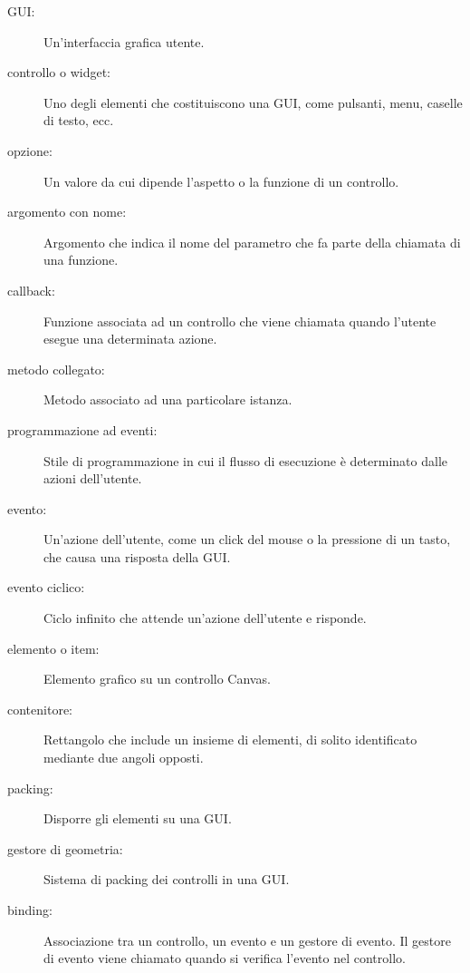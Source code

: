 \documentclass[10pt]{book}
\begin{document}
\begin{description}

\item[GUI:] Un'interfaccia grafica utente.

\item[controllo o widget:] Uno degli elementi che costituiscono una GUI, come pulsanti, menu, caselle di testo, ecc. 

\item[opzione:] Un valore da cui dipende l'aspetto o la funzione di un controllo.

\item[argomento con nome:] Argomento che indica il nome del parametro che fa parte della chiamata di una funzione.

\item[callback:] Funzione associata ad un controllo che viene chiamata quando l'utente esegue una determinata azione. 

\item[metodo collegato:] Metodo associato ad una particolare istanza.

\item[programmazione ad eventi:] Stile di programmazione in cui il flusso di esecuzione è determinato dalle azioni dell'utente.

\item[evento:] Un'azione dell'utente, come un click del mouse o la pressione di un tasto, che causa una risposta della GUI.

\item[evento ciclico:] Ciclo infinito che attende un'azione dell'utente e risponde.

\item[elemento o item:] Elemento grafico su un controllo Canvas.

\item[contenitore:] Rettangolo che include un insieme di elementi, di solito identificato mediante due angoli opposti.

\item[packing:] Disporre gli elementi su una GUI.

\item[gestore di geometria:] Sistema di packing dei controlli in una GUI.

\item[binding:] Associazione tra un controllo, un evento e un gestore di evento. Il gestore di evento viene chiamato quando si verifica l'evento nel controllo.

\end{description}
\end{document}
